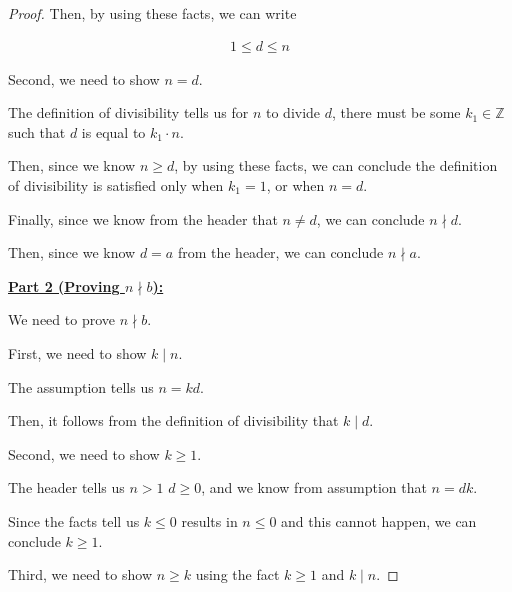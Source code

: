 \documentclass[12pt]{article}
\begin{document}
\begin{enumerate}[a.]
\begin{proof}
    Then, by using these facts, we can write

    \begin{align}
        1 \leq d \leq n
    \end{align}

    \bigskip

    Second, we need to show $n = d$.

    \bigskip

    The definition of divisibility tells us for $n$ to
    divide $d$, there must be some $k_1 \in \mathbb{Z}$ such that
    $d$ is equal to $k_1 \cdot n$.

    \bigskip

    Then, since we know $n \geq d$, by using these facts, we can conclude
    the definition of divisibility is satisfied only when $k_1 = 1$, or
    when $n = d$.

    \bigskip

    Finally, since we know from the header that $n \neq d$, we can conclude
    $n \nmid d$.

    \bigskip

    Then, since we know $d = a$ from the header, we can conclude $n \nmid a$.

    \bigskip

    \underline{\textbf{Part 2 (Proving $n \nmid b$):}}

    \bigskip

    We need to prove $n \nmid b$.

    \bigskip

    First, we need to show $k \mid n$.

    \bigskip

    The assumption tells us $n = kd$.

    \bigskip

    Then, it follows from the definition of divisibility that $k \mid d$.

    \bigskip

    Second, we need to show $k \geq 1$.

    \bigskip

    The header tells us $n > 1$ $d \geq 0$, and we know from
    assumption that $n = dk$.

    \bigskip

    Since the facts tell us $k \leq 0$ results in $n \leq 0$ and this
    cannot happen, we can conclude $k \geq 1$.

    \bigskip

    Third, we need to show $n \geq k$ using the fact $k \geq 1$ and $k \mid n$.


\end{proof}
\end{enumerate}
\end{document}
